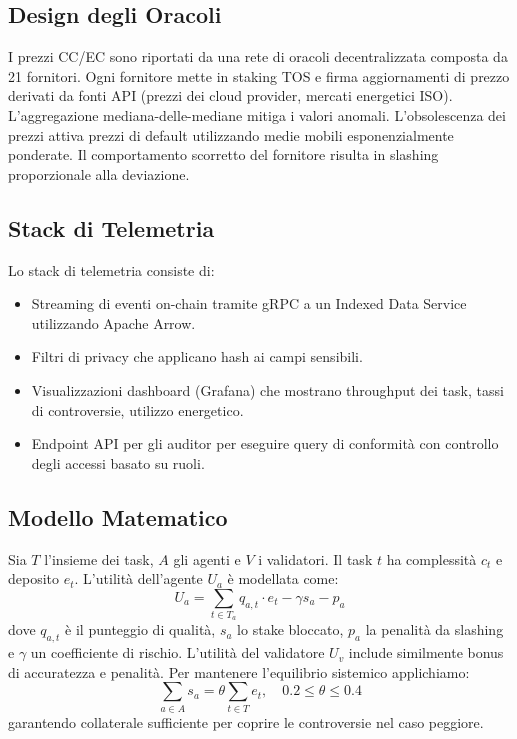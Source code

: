 \documentclass[11pt]{article}
\begin{document}
\subsection{Design degli Oracoli}
I prezzi CC/EC sono riportati da una rete di oracoli decentralizzata composta da 21 fornitori. Ogni fornitore mette in staking TOS e firma aggiornamenti di prezzo derivati da fonti API (prezzi dei cloud provider, mercati energetici ISO). L'aggregazione mediana-delle-mediane mitiga i valori anomali. L'obsolescenza dei prezzi attiva prezzi di default utilizzando medie mobili esponenzialmente ponderate. Il comportamento scorretto del fornitore risulta in slashing proporzionale alla deviazione.

\subsection{Stack di Telemetria}
Lo stack di telemetria consiste di:
\begin{itemize}[noitemsep]
  \item Streaming di eventi on-chain tramite gRPC a un Indexed Data Service utilizzando Apache Arrow.
  \item Filtri di privacy che applicano hash ai campi sensibili.
  \item Visualizzazioni dashboard (Grafana) che mostrano throughput dei task, tassi di controversie, utilizzo energetico.
  \item Endpoint API per gli auditor per eseguire query di conformità con controllo degli accessi basato su ruoli.
\end{itemize}

\subsection{Modello Matematico}
Sia $T$ l'insieme dei task, $A$ gli agenti e $V$ i validatori. Il task $t$ ha complessità $c_t$ e deposito $e_t$. L'utilità dell'agente $U_a$ è modellata come:
\begin{equation}
U_a = \sum_{t \in T_a} q_{a,t}\cdot e_t - \gamma s_a - p_a\label{eq:agent-utility}
\end{equation}
dove $q_{a,t}$ è il punteggio di qualità, $s_a$ lo stake bloccato, $p_a$ la penalità da slashing e $\gamma$ un coefficiente di rischio. L'utilità del validatore $U_v$ include similmente bonus di accuratezza e penalità. Per mantenere l'equilibrio sistemico applichiamo:
\begin{equation}
\sum_{a \in A} s_a = \theta \sum_{t \in T} e_t,\quad 0.2 \leq \theta \leq 0.4
\end{equation}
garantendo collaterale sufficiente per coprire le controversie nel caso peggiore.
\end{document}
